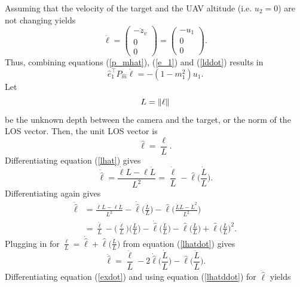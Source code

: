 Assuming that the velocity of the target and the UAV altitude (i.e. $u_2=0$) are not changing yields
\begin{equation}
\ddot{\ell}=\begin{pmatrix} -\ddot{z}_v \\ 0 \\ 0 \end{pmatrix}
=\begin{pmatrix} -u_1 \\ 0 \\ 0 \end{pmatrix}.
\label{lddot}
\end{equation}
Thus, combining equations (\ref{p_mhat}), (\ref{e_1}) and (\ref{lddot})
results in 
\begin{equation}
\hat{e}_1^{\top}P_{\hat{m}}\ddot{\ell}=-(1-m_1^2)u_1.
\label{eplddot}
\end{equation}
Let
\begin{equation}
L=\left\lVert\ell\right\rVert
\end{equation} be the unknown depth between the camera and the target, or the norm of the LOS vector. Then, the unit LOS vector is 
\begin{equation}
\hat{\ell}=\frac{\ell}{L}.
\label{lhat}
\end{equation}
Differentiating equation (\ref{lhat}) gives
\begin{equation}
\dot{\hat{\ell}}=\frac{\dot{\ell}L-\ell\dot{L}}{L^2}=\frac{\dot{\ell}}{L}-\hat{\ell}\bigg(\frac{\dot{L}}{L}\bigg).
\label{lhatdot}
\end{equation}
Differentiating again gives
\begin{align}
\ddot{\hat{\ell}}&=\frac{\ddot{\ell}L-\dot{\ell}\dot{L}}{L^2}-\dot{\hat{\ell}}\bigg(\frac{\dot{L}}{L}\bigg)-\hat{\ell}\bigg(\frac{\ddot{L}L-\dot{L}^2}{L^2}\bigg)
\\&=\frac{\ddot{\ell}}{L}-\bigg(\frac{\dot{\ell}}{L}\bigg)\bigg(\frac{\dot{L}}{L}\bigg)-\dot{\hat{\ell}}\bigg(\frac{\dot{L}}{L}\bigg)-\hat{\ell}\bigg(\frac{\ddot{L}}{L}\bigg)+\hat{\ell}\bigg(\frac{\dot{L}}{L}\bigg)^2.
\end{align}
Plugging in for $\frac{\dot{\ell}}{L}=\dot{\hat{\ell}}+\hat{\ell}\bigg(\frac{\dot{L}}{L}\bigg)$ from equation (\ref{lhatdot}) gives
\begin{equation}
\ddot{\hat{\ell}}=\frac{\ddot{\ell}}{L}-2\dot{\hat{\ell}}\bigg(\frac{\dot{L}}{L}\bigg)-\hat{\ell}\bigg(\frac{\ddot{L}}{L}\bigg).
\label{lhatddot}
\end{equation}
Differentiating equation (\ref{exdot}) and using equation (\ref{lhatddot}) for $\ddot{\hat{\ell}}$ yields
